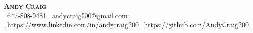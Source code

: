 \begin{center}
    \textbf{\Huge \scshape Andy Craig} \\ \vspace{3pt}
     \ \small 647-808-9481 \quad
     \ \href{mailto:andycraig200@gmail.com}{\small andycraig200@gmail.com} \quad
     \ \href{ https://www.linkedin.com/in/andycraig200 }{\small https://www.linkedin.com/in/andycraig200} \quad \space
     \ \href{ https://github.com/AndyCraig200 }{\small https://github.com/AndyCraig200}
\end{center}